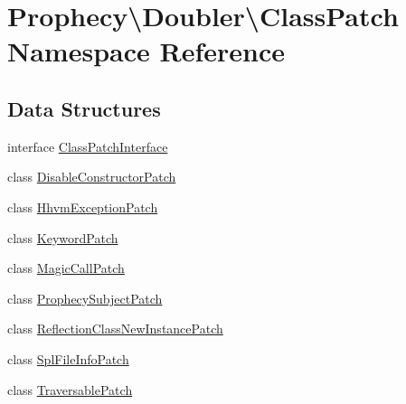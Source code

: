 \hypertarget{namespace_prophecy_1_1_doubler_1_1_class_patch}{}\section{Prophecy\textbackslash{}Doubler\textbackslash{}Class\+Patch Namespace Reference}
\label{namespace_prophecy_1_1_doubler_1_1_class_patch}
\subsection*{Data Structures}
\begin{DoxyCompactItemize}
\item 
interface \mbox{\hyperlink{interface_prophecy_1_1_doubler_1_1_class_patch_1_1_class_patch_interface}{Class\+Patch\+Interface}}
\item 
class \mbox{\hyperlink{class_prophecy_1_1_doubler_1_1_class_patch_1_1_disable_constructor_patch}{Disable\+Constructor\+Patch}}
\item 
class \mbox{\hyperlink{class_prophecy_1_1_doubler_1_1_class_patch_1_1_hhvm_exception_patch}{Hhvm\+Exception\+Patch}}
\item 
class \mbox{\hyperlink{class_prophecy_1_1_doubler_1_1_class_patch_1_1_keyword_patch}{Keyword\+Patch}}
\item 
class \mbox{\hyperlink{class_prophecy_1_1_doubler_1_1_class_patch_1_1_magic_call_patch}{Magic\+Call\+Patch}}
\item 
class \mbox{\hyperlink{class_prophecy_1_1_doubler_1_1_class_patch_1_1_prophecy_subject_patch}{Prophecy\+Subject\+Patch}}
\item 
class \mbox{\hyperlink{class_prophecy_1_1_doubler_1_1_class_patch_1_1_reflection_class_new_instance_patch}{Reflection\+Class\+New\+Instance\+Patch}}
\item 
class \mbox{\hyperlink{class_prophecy_1_1_doubler_1_1_class_patch_1_1_spl_file_info_patch}{Spl\+File\+Info\+Patch}}
\item 
class \mbox{\hyperlink{class_prophecy_1_1_doubler_1_1_class_patch_1_1_traversable_patch}{Traversable\+Patch}}
\end{DoxyCompactItemize}

